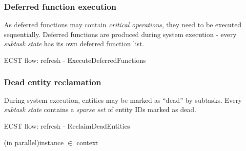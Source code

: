 \documentclass[oneside, 12pt, a4paper, openany]{book}
\begin{document}
\hypertarget{flow_exec_dfuncs}{\subsubsection{Deferred function
execution}\label{flow_exec_dfuncs}}

As deferred functions may contain \emph{critical operations}, they need
to be executed sequentially. Deferred functions are produced during
system execution - every \emph{subtask state} has its own deferred
function list.

\begin{algorithm}[H]
\caption{ECST flow: refresh - ExecuteDeferredFunctions}
\footnotesize



\end{algorithm}

\subsubsection{Dead entity reclamation}\label{dead-entity-reclamation}

During system execution, entities may be marked as ``dead'' by subtasks.
Every \emph{subtask state} contains a \emph{sparse set} of entity IDs
marked as dead.

\begin{algorithm}[H]
\caption{ECST flow: refresh - ReclaimDeadEntities}
\footnotesize



    \BlankLine

    \ForEach(in parallel){instance \I $\in$ context \C}{
    }

    \BlankLine


\end{algorithm}
\end{document}
